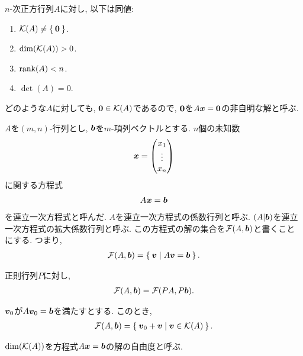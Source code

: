 \begin{cor}
  $n$-次正方行列$A$に対し,
  以下は同値:
  \begin{enumerate}
  \item $\mathcal{K}(A)\neq \Set{\boldsymbol{0}}$.
  \item $\dim(\mathcal{K}(A))>0$.
  \item $\operatorname{rank}(A)< n$.
  \item $\det(A)= 0$.
  \end{enumerate}
\end{cor}

\begin{remark}
  どのような$A$に対しても,
  $\boldsymbol{0}\in\mathcal{K}(A)$であるので,
  $\boldsymbol{0}$を$A\boldsymbol{x}=\boldsymbol{0}$の非自明な解と呼ぶ.
\end{remark}


$A$を$(m,n)$-行列とし, $\boldsymbol{b}$を$m$-項列ベクトルとする.
$n$個の未知数
\begin{align*}
  \boldsymbol{x}=\begin{pmatrix}x_1\\\vdots\\x_n\end{pmatrix}
\end{align*}
に関する方程式
\begin{align*}
  A\boldsymbol{x}=\boldsymbol{b}
\end{align*}
を連立一次方程式と呼んだ.
$A$を連立一次方程式の係数行列と呼ぶ.
$(A|\boldsymbol{b})$を連立一次方程式の拡大係数行列と呼ぶ.
この方程式の解の集合を$\mathcal{F}(A,\boldsymbol{b})$と書くことにする.
つまり,
\begin{align*}
  \mathcal{F}(A,\boldsymbol{b})=\Set{\boldsymbol{v}|A\boldsymbol{v}=\boldsymbol{b}}.
\end{align*}

\begin{prop}
  正則行列$P$に対し,
\begin{align*}
  \mathcal{F}(A,\boldsymbol{b})=\mathcal{F}(PA,P\boldsymbol{b}).
\end{align*}
\end{prop}

\begin{prop}
  $\boldsymbol{v}_0$が$A\boldsymbol{v}_0=\boldsymbol{b}$を満たすとする.
  このとき,
  \begin{align*}
    \mathcal{F}(A,\boldsymbol{b})=\Set{\boldsymbol{v}_0+\boldsymbol{v}|\boldsymbol{v}\in \mathcal{K}(A)}.
  \end{align*}
\end{prop}
\begin{definition}
$\dim(\mathcal{K}(A))$を方程式$A\boldsymbol{x}=\boldsymbol{b}$の解の自由度と呼ぶ.
\end{definition}

